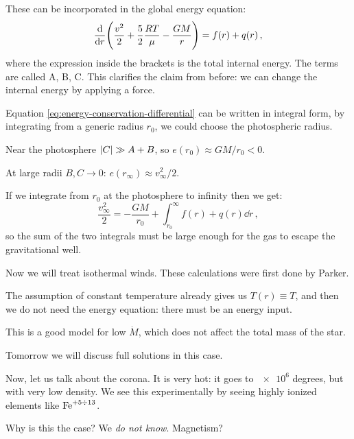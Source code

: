 \documentclass[main.tex]{subfiles}
\begin{document}
These can be incorporated in the global energy equation: 
%
\begin{equation} \label{eq:energy-conservation-differential} 
  \dv{}{r} \qty(\frac{v^2}{2} + \frac{5}{2} \frac{RT}{\mu }- \frac{GM}{r}) = f(r) + q(r)
\,,
\end{equation}
%
where the expression inside the brackets is the total internal energy. The terms are called A, B, C.
This clarifies the claim from before: we can change the internal energy by applying a force.


Equation \eqref{eq:energy-conservation-differential} can be written in integral form, by integrating from a generic radius \(r_0 \), we could choose the photospheric radius. 

Near the photosphere \(\abs{C} \gg A+B\), so  \(e(r_0 ) \approx GM / r_0 < 0 \).

At large radii \(B, C \to 0\): \(e(r_{\infty}) \approx v_{\infty}^2 /2\).

If we integrate from \(r_0 \) at the photosphere to infinity then we get: 
%
\begin{equation}
  \frac{v^2_{\infty}}{2} = - \frac{GM}{r_0 } + \int _{r_0 }^{\infty} f(r) + q(r) \dd{r} 
\,,
\end{equation}
%
so the sum of the two integrals must be large enough for the gas to escape the gravitational well.


Now we will treat isothermal winds. 
These calculations were first done by Parker.

The assumption of constant temperature already gives us \(T(r) \equiv T\), and then we do not need the energy equation: there must be an energy input.


This is a good model for low \(\dot{M} \), which does not affect the total mass of the star.

Tomorrow we will discuss full solutions in this case.

Now, let us talk about the corona.
It is very hot: it goes to \(\num{e6}\) degrees,  but with very low density.
We see this experimentally by seeing highly ionized 
elements like \(\ce{Fe}^{+5 \divisionsymbol 13}\).

Why is this the case? We \emph{do not know}. Magnetism?
\end{document}
